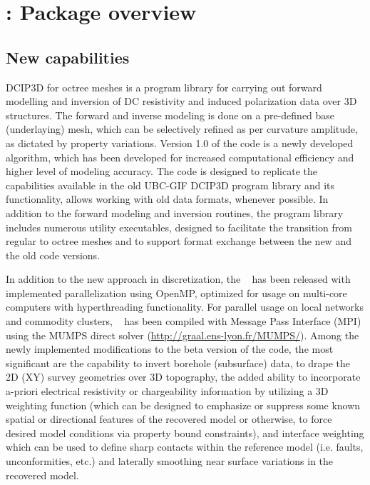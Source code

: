 \section{\prog: Package overview}

\subsection{New capabilities}
DCIP3D for octree meshes is a program library for carrying out forward modelling and inversion of DC resistivity and induced polarization data over 3D structures. The forward and inverse modeling is done on a pre-defined base (underlaying) mesh, which can be selectively refined as per curvature amplitude, as dictated by property variations. Version 1.0 of the code is a newly developed algorithm, which has been developed for increased computational efficiency and higher level of modeling accuracy. The code is designed to replicate the capabilities available in the old UBC-GIF DCIP3D program library and its functionality, allows working with old data formats, whenever possible. In addition to the forward modeling and inversion routines, the program library includes numerous utility executables, designed to facilitate the transition from regular to octree meshes  and to support format exchange between the new and the old code versions.

In addition to the new approach in discretization, the \programName~ has been released with implemented parallelization using OpenMP, optimized for usage on multi-core computers with hyperthreading functionality. For parallel usage on local networks and commodity clusters, \programName~ has been compiled with Message Pass Interface (MPI) using the MUMPS direct solver (\url{http://graal.ens-lyon.fr/MUMPS/}). Among the newly implemented modifications to the beta version of the code, the most significant are the capability to invert borehole (subsurface) data, to drape the 2D (XY) survey geometries over 3D topography, the added ability to incorporate a-priori electrical resistivity or chargeability information by utilizing a 3D weighting function (which can be designed to emphasize or suppress some known spatial or directional features of the recovered model or otherwise, to force desired model conditions via property bound constraints), and interface weighting which can be used to define sharp contacts within the reference model (i.e. faults, unconformities, etc.) and laterally smoothing near surface variations in the recovered model.  

